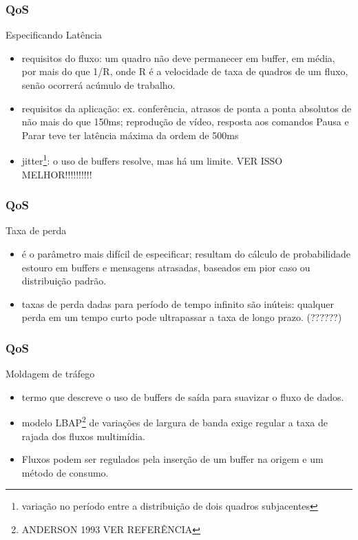 \documentclass[]{beamer}
\begin{document}
\begin{frame}
  \frametitle{QoS}
Especificando Latência
\begin{itemize}
  \item requisitos do fluxo: um quadro não deve permanecer em buffer, 
em média, por mais do que 1/R,
onde R é a velocidade de taxa de quadros de um fluxo,
 senão ocorrerá acúmulo de trabalho. 
  \item requisitos da aplicação: ex. conferência, atrasos 
de ponta a ponta absolutos de não
mais do que 150ms; reprodução de vídeo, resposta aos comandos
 Pausa e Parar teve ter latência
máxima da ordem de 500ms
  \item jitter\footnote{variação no período entre a
 distribuição de dois quadros subjacentes}: o
uso de buffers resolve, mas há um limite. VER ISSO MELHOR!!!!!!!!!!
\end{itemize}
\end{frame}

\begin{frame}
  \frametitle{QoS}
Taxa de perda
\begin{itemize}
  \item é o parâmetro mais difícil de especificar; resultam do cálculo de probabilidade 
estouro em buffers e mensagens atrasadas, baseados em pior caso ou distribuição padrão.
  \item taxas de perda dadas para período de tempo infinito são inúteis: qualquer perda
em um tempo curto pode ultrapassar a taxa de longo prazo. (??????)
\end{itemize}
\end{frame}

\begin{frame}
  \frametitle{QoS}
Moldagem de tráfego
\begin{itemize}
  \item termo que descreve o uso de buffers de saída para suavizar o fluxo de dados.
  \item modelo LBAP\footnote{ANDERSON 1993 VER REFERÊNCIA} de variações de largura de banda 
exige regular a taxa de rajada dos fluxos multimídia.
  \item Fluxos podem ser regulados pela inserção de um buffer na origem e um método de 
consumo.
\end{itemize}
\end{frame}
\end{document}
